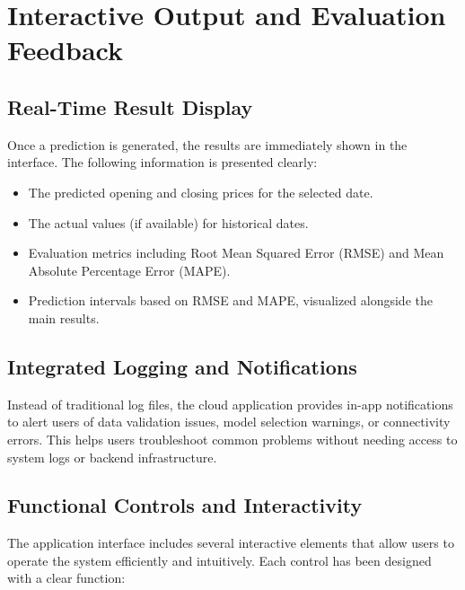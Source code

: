 \section{Interactive Output and Evaluation Feedback}

\subsection{Real-Time Result Display}
Once a prediction is generated, the results are immediately shown in the interface. The following information is presented clearly:
\begin{itemize}
	\item The predicted opening and closing prices for the selected date.
	\item The actual values (if available) for historical dates.
	\item Evaluation metrics including Root Mean Squared Error (RMSE) and Mean Absolute Percentage Error (MAPE).
	\item Prediction intervals based on RMSE and MAPE, visualized alongside the main results.
\end{itemize}

\subsection{Integrated Logging and Notifications}
Instead of traditional log files, the cloud application provides in-app notifications to alert users of data validation issues, model selection warnings, or connectivity errors. This helps users troubleshoot common problems without needing access to system logs or backend infrastructure.

\subsection{Functional Controls and Interactivity}
The application interface includes several interactive elements that allow users to operate the system efficiently and intuitively. Each control has been designed with a clear function:

